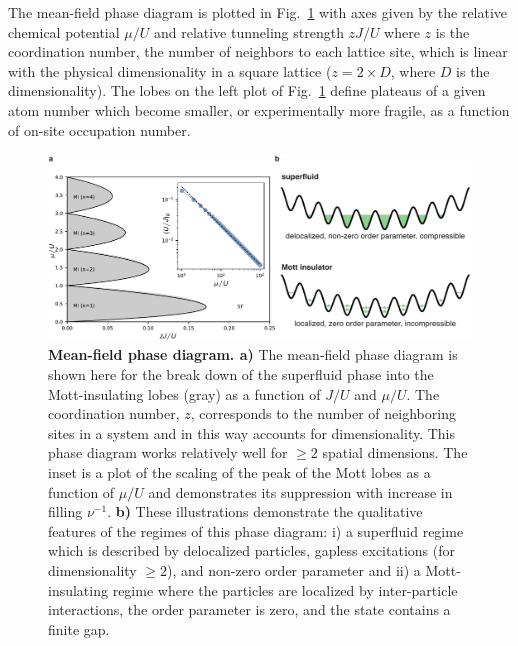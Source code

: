 The mean-field phase diagram is plotted in Fig.~\ref{fig:MF} with axes given by the relative chemical potential $\mu/U$ and relative tunneling strength $zJ/U$ where $z$ is the coordination number, the number of neighbors to each lattice site, which is linear with the physical dimensionality in a square lattice ($ z=2\times D $, where $D$ is the dimensionality). The lobes on the left plot of Fig.~\ref{fig:MF} define plateaus of a given atom number which become smaller, or experimentally more fragile, as a function of on-site occupation number.
\begin{figure}[t!]
		\includegraphics[width=\columnwidth]{figures/ch1/MeanFieldPhaseDiag/MeanFieldDiag_v3.pdf} 
		\caption{\textbf{Mean-field phase diagram. a)} The mean-field phase diagram is shown here for the break down of the superfluid phase into the Mott-insulating lobes (gray) as a function of $J/U$ and $\mu/U$. The coordination number, $z$, corresponds to the number of neighboring sites in a system and in this way accounts for dimensionality. This phase diagram works relatively well for $\geq 2$ spatial dimensions. The inset is a plot of the scaling of the peak of the Mott lobes as a function of $\mu/U$ and demonstrates its suppression with increase in filling $\nu^{-1}$. \textbf{b)} These illustrations demonstrate the qualitative features of the regimes of this phase diagram: i) a superfluid regime which is described by delocalized particles, gapless excitations (for dimensionality $\geq 2$), and non-zero order parameter and ii) a Mott-insulating regime where the particles are localized by inter-particle interactions, the order parameter is zero, and the state contains a finite gap.}
		\label{fig:MF}	
\end{figure}

